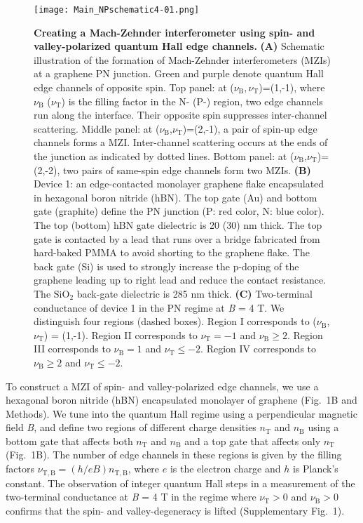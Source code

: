 \documentclass[%
reprint,amsmath,amssymb,aps,prl,superscriptaddress,
twocolumn
]{revtex4-1}
\begin{document}
		\begin{figure}
			\texttt{[image: Main\_NPschematic4-01.png]}%
			\caption{\textbf{Creating a Mach-Zehnder interferometer using spin- and valley-polarized quantum Hall edge channels.} \textbf{(A)} Schematic illustration of the formation of Mach-Zehnder interferometers (MZIs) at a graphene PN junction. Green and purple denote quantum Hall edge channels of opposite spin. Top panel: at ($\nu_\mathrm{B},\nu_\mathrm{T}$)=(1,-1), where $\nu_\mathrm{B}$ ($\nu_\mathrm{T}$) is the filling factor in the N- (P-) region, two edge channels run along the interface. Their opposite spin suppresses inter-channel scattering. Middle panel: at ($\nu_\mathrm{B}$,$\nu_\mathrm{T}$)=(2,-1), a pair of spin-up edge channels forms a MZI. Inter-channel scattering occurs at the ends of the junction as indicated by dotted lines. Bottom panel: at ($\nu_\mathrm{B}$,$\nu_\mathrm{T}$)=(2,-2), two pairs of same-spin edge channels form two MZIs. \textbf{(B)} Device 1: an edge-contacted monolayer graphene flake encapsulated in hexagonal boron nitride (hBN). The top gate (Au) and bottom gate (graphite) define the PN junction (P: red color, N: blue color). The top (bottom) hBN gate dielectric is 20 (30) nm thick. The top gate is contacted by a lead that runs over a bridge fabricated from hard-baked PMMA to avoid shorting to the graphene flake. The back gate (Si) is used to strongly increase the p-doping of the graphene leading up to right lead and reduce the contact resistance. The $\mathrm{SiO}_2$ back-gate dielectric is 285 nm thick. \textbf{(C)} Two-terminal conductance of device 1 in the PN regime at \emph{B} = 4 T. We distinguish four regions (dashed boxes). Region I corresponds to ($\nu_\mathrm{B}$,$\nu_\mathrm{T}$) = (1,-1). Region II corresponds to $\nu_\mathrm{T} = -1$ and $\nu_\mathrm{B} \geq 2$. Region III corresponds to $\nu_\mathrm{B} = 1$ and $\nu_\mathrm{T} \leq -2$. Region IV corresponds to $\nu_\mathrm{B} \geq 2$ and $\nu_\mathrm{T} \leq -2$.}
			\label{fig:F1}
		\end{figure}
			
	To construct a MZI of spin- and valley-polarized edge channels, we use a hexagonal boron nitride (hBN) encapsulated monolayer of graphene (Fig.~1B and Methods). We tune into the quantum Hall regime using a perpendicular magnetic field \emph{B}, and define two regions of different charge densities $n_\mathrm{T}$ and $n_\mathrm{B}$ using a bottom gate that affects both $n_\mathrm{T}$ and $n_\mathrm{B}$ and a top gate that affects only $n_\mathrm{T}$ (Fig.~1B).  The number of edge channels in these regions is given by the filling factors $\nu_\mathrm{T,B}=(h/eB) n_\mathrm{T,B}$, where $e$ is the electron charge and $h$ is Planck's constant. The observation of integer quantum Hall steps in a measurement of the two-terminal conductance at \emph{B} = 4 T in the regime where $\nu_\mathrm{T}>0$ and $\nu_\mathrm{B}>0$ confirms that the spin- and valley-degeneracy is lifted (Supplementary Fig.~1). 
	
\end{document}
